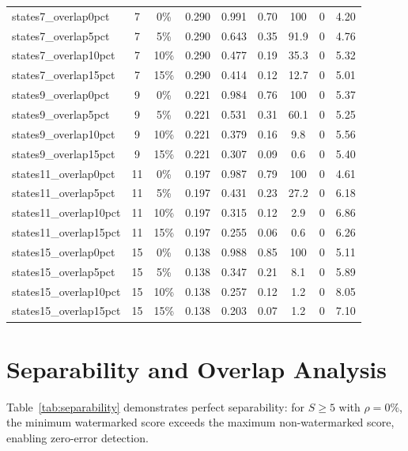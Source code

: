 \documentclass[11pt]{article}
\theoremstyle{definition}
\theoremstyle{remark}
\begin{document}
\begin{table}[H]
\begin{tabular}{@{}lcccccccc@{}}
        \midrule
        states7\_overlap0pct & 7 & 0\% & 0.290 & 0.991 & 0.70 & 100 & 0 & 4.20 \\
        states7\_overlap5pct & 7 & 5\% & 0.290 & 0.643 & 0.35 & 91.9 & 0 & 4.76 \\
        states7\_overlap10pct & 7 & 10\% & 0.290 & 0.477 & 0.19 & 35.3 & 0 & 5.32 \\
        states7\_overlap15pct & 7 & 15\% & 0.290 & 0.414 & 0.12 & 12.7 & 0 & 5.01 \\
        \midrule
        states9\_overlap0pct & 9 & 0\% & 0.221 & 0.984 & 0.76 & 100 & 0 & 5.37 \\
        states9\_overlap5pct & 9 & 5\% & 0.221 & 0.531 & 0.31 & 60.1 & 0 & 5.25 \\
        states9\_overlap10pct & 9 & 10\% & 0.221 & 0.379 & 0.16 & 9.8 & 0 & 5.56 \\
        states9\_overlap15pct & 9 & 15\% & 0.221 & 0.307 & 0.09 & 0.6 & 0 & 5.40 \\
        \midrule
        states11\_overlap0pct & 11 & 0\% & 0.197 & 0.987 & 0.79 & 100 & 0 & 4.61 \\
        states11\_overlap5pct & 11 & 5\% & 0.197 & 0.431 & 0.23 & 27.2 & 0 & 6.18 \\
        states11\_overlap10pct & 11 & 10\% & 0.197 & 0.315 & 0.12 & 2.9 & 0 & 6.86 \\
        states11\_overlap15pct & 11 & 15\% & 0.197 & 0.255 & 0.06 & 0.6 & 0 & 6.26 \\
        \midrule
        states15\_overlap0pct & 15 & 0\% & 0.138 & 0.988 & 0.85 & 100 & 0 & 5.11 \\
        states15\_overlap5pct & 15 & 5\% & 0.138 & 0.347 & 0.21 & 8.1 & 0 & 5.89 \\
        states15\_overlap10pct & 15 & 10\% & 0.138 & 0.257 & 0.12 & 1.2 & 0 & 8.05 \\
        states15\_overlap15pct & 15 & 15\% & 0.138 & 0.203 & 0.07 & 1.2 & 0 & 7.10 \\
        \bottomrule
    \end{tabular}
\end{table}

\section{Separability and Overlap Analysis}
\label{app:separability}

Table~\ref{tab:separability} demonstrates perfect separability: for $S \geq 5$ with $\rho = 0\%$, the minimum watermarked score exceeds the maximum non-watermarked score, enabling zero-error detection.
\end{document}
